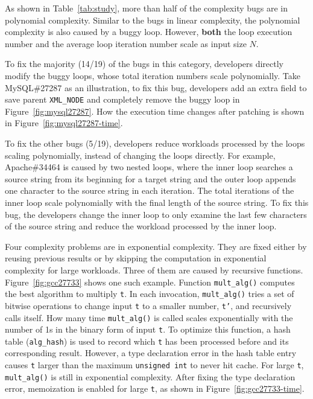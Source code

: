 As shown in Table~\ref{tab:study}, 
more than half of the complexity bugs are in polynomial complexity. 
Similar to the bugs in linear complexity,
the polynomial complexity is also caused by a buggy loop.
However, {\bf both} the loop execution number 
and the average loop iteration number
scale as input size $N$.




%

To fix the majority (14/19) of the bugs in this category,
developers directly modify the buggy loops, 
whose total iteration numbers scale polynomially.
Take MySQL\#27287 as an illustration,
to fix this bug,
developers add an extra field to save parent \texttt{XML\_NODE}
and completely remove the buggy loop in Figure~\ref{fig:mysql27287}.
How the execution time changes after patching is 
shown in Figure~\ref{fig:mysql27287-time}. 


To fix the other bugs (5/19),
developers reduce workloads processed by the loops scaling polynomially, 
instead of changing the loops directly.
For example, Apache\#34464 is caused by two nested loops, 
where the inner loop searches a source string from its beginning 
for a target string 
and the outer loop appends one character to the source 
string in each iteration. 
The total iterations of the inner loop scale polynomially with 
the final length of the source string.
To fix this bug, the developers change the inner loop to only 
examine the last few characters of the source string and reduce the workload 
processed by the inner loop.  





Four complexity problems are in exponential complexity. 
They are fixed 
either by reusing previous results 
or by skipping the computation in exponential complexity for large workloads. 
Three of them are caused by recursive functions. 
Figure~\ref{fig:gcc27733} shows one such example. 
Function \texttt{mult\_alg()} computes the best algorithm to multiply \texttt{t}.
In each invocation, \texttt{mult\_alg()} tries a set of bitwise 
operations to change input 
\texttt{t} to a smaller number, \texttt{t'}, and recursively calls itself.
How many time \texttt{mult\_alg()} is called scales exponentially 
with the number of 1s in the binary form of input \texttt{t}.
To optimize this function, a hash table (\texttt{alg\_hash}) is used to record
which  \texttt{t} has been processed before and its corresponding result.
However, a type declaration error in the hash table entry causes 
\texttt{t} larger than the maximum \texttt{unsigned int} to never hit cache.
For large \texttt{t}, \texttt{mult\_alg()} is still in exponential complexity. 
After fixing the type declaration error, memoization is 
enabled for large \texttt{t}, 
as shown in Figure~\ref{fig:gcc27733-time}.

